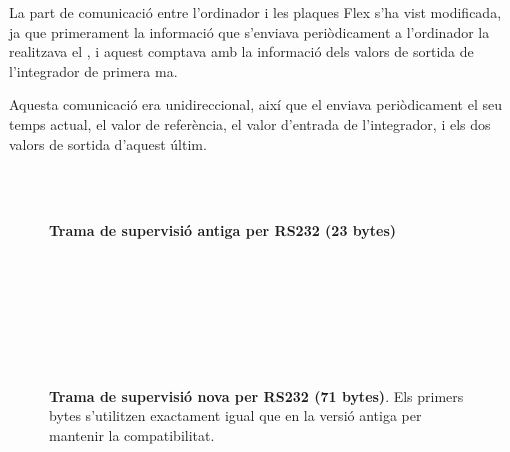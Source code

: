 La part de comunicació entre l'ordinador i les plaques Flex s'ha vist modificada, ja que primerament la informació que s'enviava periòdicament a l'ordinador la realitzava el \SensorActuador, i aquest comptava amb la informació dels valors de sortida de l'integrador de primera ma.

Aquesta comunicació era unidireccional, així que el \Supervisor enviava periòdicament el seu temps actual, el valor de referència, el valor d'entrada de l'integrador, i els dos valors de sortida d'aquest últim.

\begin{figure}[ht!]
	\begin{bytefield}[bitwidth=\linewidth/23]{23}
		      \\
	     \\
	          
	\end{bytefield}
    \caption[Trama de supervisió antiga per RS232]{\small\textbf{Trama de supervisió antiga per RS232 (23 bytes)}}
    \label{fig:bit_encoding:antic}
\end{figure}

\begin{figure}[ht!]
	\begin{bytefield}[bitwidth=\linewidth/23]{23}
		      \\
	     \\
	             \\
	                           \\ 
	                           \\
	      \\
	\end{bytefield}
    \caption[Trama de supervisió nova per RS232]{\small\textbf{Trama de supervisió nova per RS232 (71 bytes)}. Els primers bytes s'utilitzen exactament igual que en la versió antiga per mantenir la compatibilitat.}
    \label{fig:bit_encoding:nou}
\end{figure}


